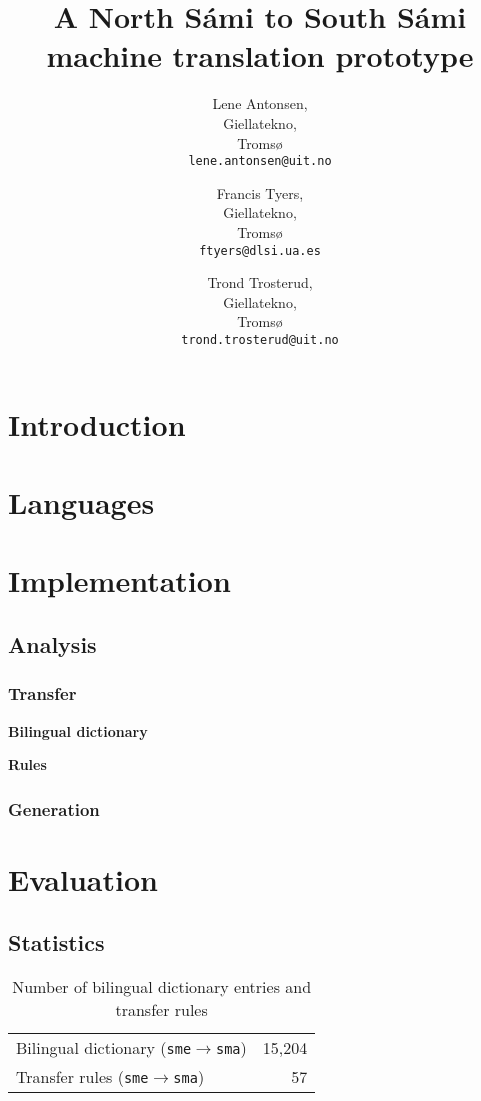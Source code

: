 \documentclass[a4paper,11pt,twocolumn]{article}
\title{A North Sámi to South Sámi machine translation prototype}
\author{Lene Antonsen,\\Giellatekno,\\Tromsø\\{\tt lene.antonsen@uit.no}
\and Francis Tyers,\\Giellatekno,\\Tromsø\\{\tt ftyers@dlsi.ua.es}
\and Trond Trosterud,\\Giellatekno,\\Tromsø\\{\tt trond.trosterud@uit.no}}
\date{}
\begin{document}
\maketitle

\section{Introduction}

\cite{tyers09} \cite{wiechetek10} \cite{trosterud12}

\section{Languages}


\section{Implementation}


\subsection{Analysis}

\subsubsection{Transfer}

\textbf{Bilingual dictionary}

\textbf{Rules}

\subsubsection{Generation}

\section{Evaluation}

\subsection{Statistics}

\begin{table}
  \begin{center}
    \begin{tabular}{|l|r|}
      \hline
      Bilingual dictionary ({\tt sme}$\rightarrow${\tt sma}) & 15,204 \\ %
      Transfer rules ({\tt sme}$\rightarrow${\tt sma}) & 57 \\
      \hline
    \end{tabular}
    \label{table:transfer}
    \caption{Number of bilingual dictionary entries and transfer rules}
  \end{center}
\end{table}
\end{document}

